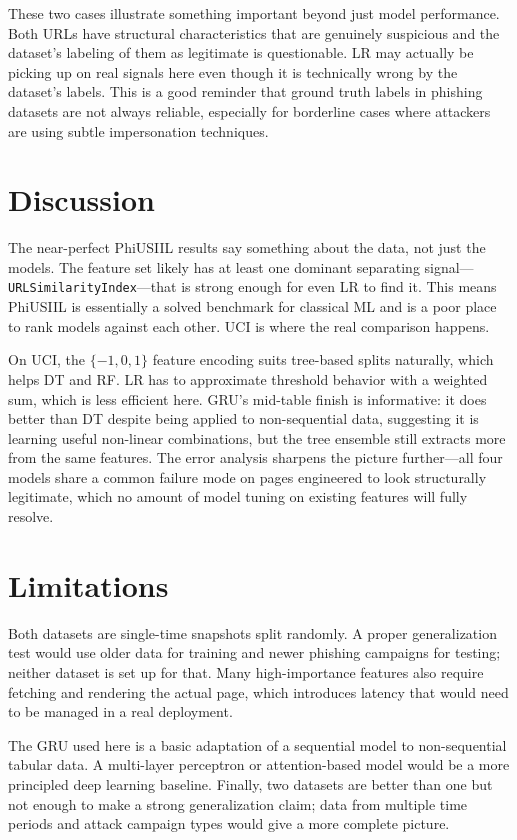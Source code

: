 \documentclass{article}
\begin{document}
These two cases illustrate something important beyond just model performance.
Both URLs have structural characteristics that are genuinely suspicious and the dataset's labeling of them as legitimate is questionable.
LR may actually be picking up on real signals here even though it is technically wrong by the dataset's labels.
This is a good reminder that ground truth labels in phishing datasets are not always reliable, especially for borderline cases where attackers are using subtle impersonation techniques.

\section{Discussion}
\label{sec:discussion}

The near-perfect PhiUSIIL results say something about the data, not just the models.
The feature set likely has at least one dominant separating signal---\texttt{URLSimilarityIndex}---that is strong enough for even LR to find it.
This means PhiUSIIL is essentially a solved benchmark for classical ML and is a poor place to rank models against each other.
UCI is where the real comparison happens.

On UCI, the $\{-1, 0, 1\}$ feature encoding suits tree-based splits naturally, which helps DT and RF.
LR has to approximate threshold behavior with a weighted sum, which is less efficient here.
GRU's mid-table finish is informative: it does better than DT despite being applied to non-sequential data, suggesting it is learning useful non-linear combinations, but the tree ensemble still extracts more from the same features.
The error analysis sharpens the picture further---all four models share a common failure mode on pages engineered to look structurally legitimate, which no amount of model tuning on existing features will fully resolve.

\section{Limitations}
\label{sec:limitations}

Both datasets are single-time snapshots split randomly.
A proper generalization test would use older data for training and newer phishing campaigns for testing; neither dataset is set up for that.
Many high-importance features also require fetching and rendering the actual page, which introduces latency that would need to be managed in a real deployment.

The GRU used here is a basic adaptation of a sequential model to non-sequential tabular data.
A multi-layer perceptron or attention-based model would be a more principled deep learning baseline.
Finally, two datasets are better than one but not enough to make a strong generalization claim; data from multiple time periods and attack campaign types would give a more complete picture.
\end{document}
